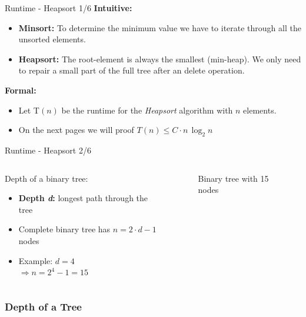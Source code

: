 \documentclass{beamer}
\begin{document}

\begin{frame}{Runtime - Heapsort 1/6}
  \textbf{Intuitive:}
  \begin{itemize}
    \item
      \textbf{Minsort:}
      To determine the minimum value we have to iterate through all the
      unsorted elements.
    \item
      \textbf{Heapsort:}
      The root-element is always the smallest (min-heap).
      We only need to repair a small part of the full tree after an delete
      operation.
  \end{itemize}
  \textbf{Formal:}
  \begin{itemize}
    \item 
      Let T$(n)$ be the runtime for the \textit{Heapsort}
      algorithm with $n$ elements.
    \item
      On the next pages we will proof $T(n) \leq C \cdot n \, \log_2 n$
  \end{itemize}
\end{frame}


\begin{frame}{Runtime - Heapsort 2/6}
  \begin{columns}
    \begin{column}{0.5\textwidth}
      Depth of a binary tree:
      \begin{itemize}
        \item
          \textbf{Depth \textit{d}:}
          longest path through the tree
        \item
          Complete binary tree has $n = 2 \cdot d - 1$ nodes
        \item
          Example: $d = 4$\\
          $\Rightarrow n = 2^4 - 1 = 15$
      \end{itemize}
    \end{column}
    \begin{column}{0.5\textwidth}
      \begin{figure}
        \begin{centering}%
          \caption{Binary tree with 15 nodes}%
          \label{fig:binary_tree}%
        \end{centering}%
      \end{figure}
    \end{column}
  \end{columns}
\end{frame}\subsubsection{Depth of a Tree}
\end{document}
